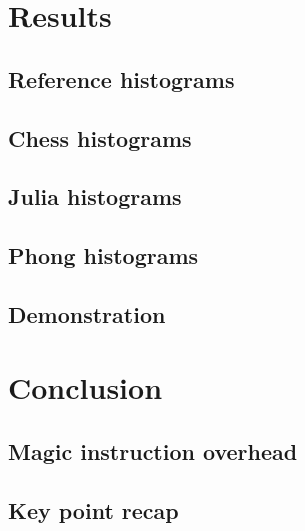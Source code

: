 \documentclass{beamer}
\begin{document}
	\section{Results}
	\subsection{Reference histograms}
	
	\subsection{Chess histograms}
	
	\subsection{Julia histograms}
	
	\subsection{Phong histograms}
	
	\subsection{Demonstration}
	

	\section{Conclusion}
	\subsection{Magic instruction overhead}
	
	\subsection{Key point recap}
	

	

	

	
\end{document}
